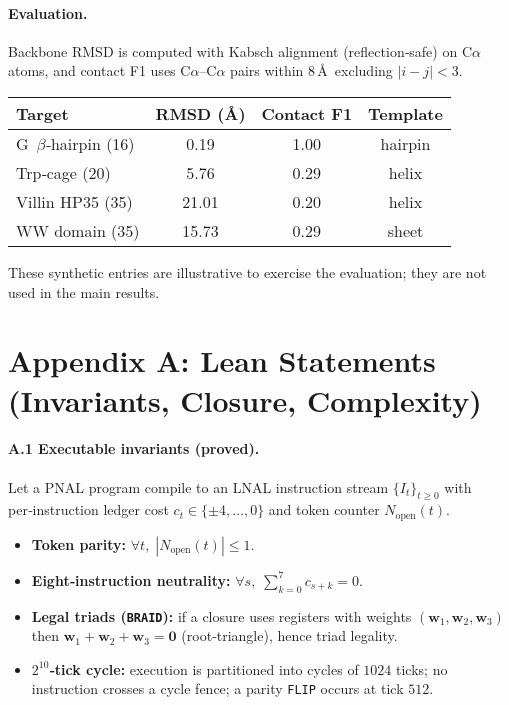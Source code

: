 \documentclass[12pt,a4paper]{article}
\begin{document}
\paragraph{Evaluation.}
Backbone RMSD is computed with Kabsch alignment (reflection‑safe) on C$\alpha$ atoms, and contact F1 uses C$\alpha$–C$\alpha$ pairs within 8\,\AA\ excluding $|i-j|<3$.
\begin{center}
\renewcommand{\arraystretch}{1.15}
\begin{tabular}{@{}lccc@{}}
\toprule
Target & RMSD (\AA) & Contact F1 & Template \\
\midrule
G~$\beta$‑hairpin (16) & 0.19 & 1.00& hairpin \\
Trp‑cage (20) & 5.76 & 0.29& helix \\
Villin HP35 (35) & 21.01 & 0.20& helix \\
WW domain (35) & 15.73 & 0.29& sheet \\
\bottomrule
\end{tabular}
\end{center}
These synthetic entries are illustrative to exercise the evaluation; they are not used in the main results.

\appendix
\section*{Appendix A: Lean Statements (Invariants, Closure, Complexity)}

\paragraph{A.1 Executable invariants (proved).}
Let a PNAL program compile to an LNAL instruction stream $\{I_t\}_{t\ge 0}$ with per‑instruction ledger cost $c_t\in\{\pm4,\ldots,0\}$ and token counter $N_{\mathrm{open}}(t)$.
\begin{itemize}
  \item \textbf{Token parity:} $\forall t,\; |N_{\mathrm{open}}(t)| \le 1$.
  \item \textbf{Eight‑instruction neutrality:} $\forall s,\; \sum_{k=0}^{7} c_{s+k} = 0$.
  \item \textbf{Legal triads (\texttt{BRAID}):} if a closure uses registers with weights $(\mathbf w_1,\mathbf w_2,\mathbf w_3)$ then $\mathbf w_1+\mathbf w_2+\mathbf w_3=\mathbf 0$ (root‑triangle), hence triad legality.
  \item \textbf{$2^{10}$‑tick cycle:} execution is partitioned into cycles of $1024$ ticks; no instruction crosses a cycle fence; a parity \texttt{FLIP} occurs at tick $512$.
\end{itemize}
\end{document}
